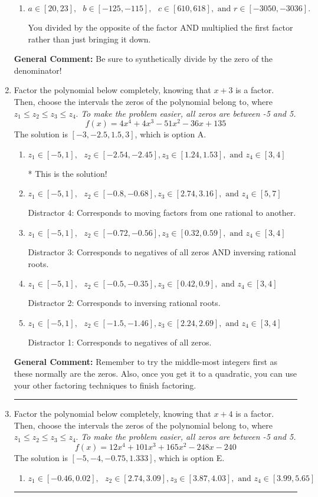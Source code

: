 \documentclass{extbook}[14pt]
\newcommand{\litem}[1]{\item #1

\rule{\textwidth}{0.4pt}}
\begin{document}
\begin{enumerate}
{\begin{enumerate}[label=\Alph*.]
 You divided by the opposite of the factor.
\item \( a \in [20, 23], \text{   } b \in [-125, -115], \text{   } c \in [610, 618], \text{   and   } r \in [-3050, -3036]. \)

 You divided by the opposite of the factor AND multiplied the first factor rather than just bringing it down.
\end{enumerate}

\textbf{General Comment:} Be sure to synthetically divide by the zero of the denominator!
}
\litem{
Factor the polynomial below completely, knowing that $x + 3$ is a factor. Then, choose the intervals the zeros of the polynomial belong to, where $z_1 \leq z_2 \leq z_3 \leq z_4$. \textit{To make the problem easier, all zeros are between -5 and 5.}
\[ f(x) = 4x^{4} +4 x^{3} -51 x^{2} -36 x + 135 \]The solution is \( [-3, -2.5, 1.5, 3] \), which is option A.\begin{enumerate}[label=\Alph*.]
\item \( z_1 \in [-5, 1], \text{   }  z_2 \in [-2.54, -2.45], z_3 \in [1.24, 1.53], \text{   and   } z_4 \in [3, 4] \)

* This is the solution!
\item \( z_1 \in [-5, 1], \text{   }  z_2 \in [-0.8, -0.68], z_3 \in [2.74, 3.16], \text{   and   } z_4 \in [5, 7] \)

 Distractor 4: Corresponds to moving factors from one rational to another.
\item \( z_1 \in [-5, 1], \text{   }  z_2 \in [-0.72, -0.56], z_3 \in [0.32, 0.59], \text{   and   } z_4 \in [3, 4] \)

 Distractor 3: Corresponds to negatives of all zeros AND inversing rational roots.
\item \( z_1 \in [-5, 1], \text{   }  z_2 \in [-0.5, -0.35], z_3 \in [0.42, 0.9], \text{   and   } z_4 \in [3, 4] \)

 Distractor 2: Corresponds to inversing rational roots.
\item \( z_1 \in [-5, 1], \text{   }  z_2 \in [-1.5, -1.46], z_3 \in [2.24, 2.69], \text{   and   } z_4 \in [3, 4] \)

 Distractor 1: Corresponds to negatives of all zeros.
\end{enumerate}

\textbf{General Comment:} Remember to try the middle-most integers first as these normally are the zeros. Also, once you get it to a quadratic, you can use your other factoring techniques to finish factoring.
}
\litem{
Factor the polynomial below completely, knowing that $x + 4$ is a factor. Then, choose the intervals the zeros of the polynomial belong to, where $z_1 \leq z_2 \leq z_3 \leq z_4$. \textit{To make the problem easier, all zeros are between -5 and 5.}
\[ f(x) = 12x^{4} +101 x^{3} +165 x^{2} -248 x -240 \]The solution is \( [-5, -4, -0.75, 1.333] \), which is option E.\begin{enumerate}[label=\Alph*.]
\item \( z_1 \in [-0.46, 0.02], \text{   }  z_2 \in [2.74, 3.09], z_3 \in [3.87, 4.03], \text{   and   } z_4 \in [3.99, 5.65] \)


\end{enumerate}}
\end{enumerate}
\end{document}
